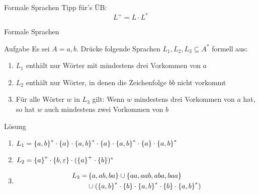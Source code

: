 \begin{frame}{Formale Sprachen}
    Tipp für's ÜB:
    \[
    	L^+ = L \cdot L^*
    \]
\end{frame}

\begin{frame}{Formale Sprachen}
	\begin{exampleblock}{Aufgabe}
		Es sei $A = {a,b}$. Drücke folgende Sprachen $L_1, L_2, L_3 \subseteq A^*$ formell aus:
		\begin{enumerate}
			\item $L_1$ enthält nur Wörter mit mindestens drei Vorkommen von $a$
			\item $L_2$ enthält nur Wörter, in denen die Zeichenfolge $bb$ nicht vorkommt
			\item Für alle Wörter $w$ in $L_3$ gilt: Wenn $w$ mindestens drei Vorkommen von $a$ hat, so hat $w$ auch mindestens zwei Vorkommen von $b$ 
		\end{enumerate}
	\end{exampleblock}

	\begin{block}{Lösung}
		\begin{enumerate}
			\item $L_1 = \left\{ a,b \right\}^\ast \cdot \left\{ a \right\} \cdot \left\{ a,b \right\}^\ast \cdot \left\{ a \right\} \cdot \left\{ a,b \right\}^\ast \cdot \left\{ a \right\} \cdot \left\{ a,b \right\}^\ast$
			\item $L_2 = \left\{ a \right\}^\ast \cdot \left\{ b, \varepsilon \right\} \cdot (\left\{ a \right\}^+ \cdot \left\{ b \right\})^\ast$
			\item \begin{align*}L_3 = & \left\{ a, ab, ba \right\} \cup \left\{ aa, aab, aba, baa \right\} \\ & \cup (\left\{ a,b \right\}^\ast \cdot \left\{ b \right\} \cdot \left\{ a,b \right\}^\ast \cdot \left\{ b \right\} \cdot \left\{ a,b \right\}^\ast) \end{align*}
		\end{enumerate}
	\end{block}
\end{frame}